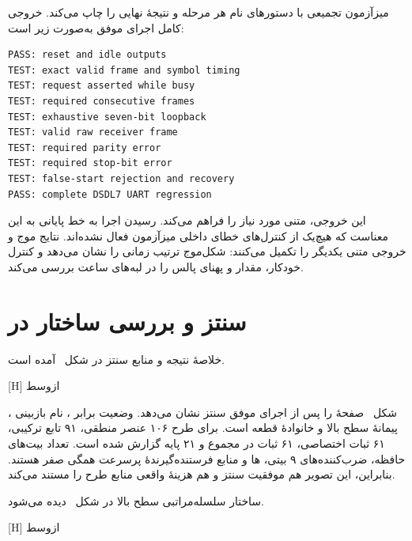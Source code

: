میزآزمون تجمیعی با دستورهای  نام هر مرحله و نتیجهٔ نهایی را چاپ می‌کند.
خروجی کامل اجرای موفق به‌صورت زیر است:

\begin{dsdlcodeblock}
\begin{verbatim}
PASS: reset and idle outputs
TEST: exact valid frame and symbol timing
TEST: request asserted while busy
TEST: required consecutive frames
TEST: exhaustive seven-bit loopback
TEST: valid raw receiver frame
TEST: required parity error
TEST: required stop-bit error
TEST: false-start rejection and recovery
PASS: complete DSDL7 UART regression
\end{verbatim}
\end{dsdlcodeblock}

این خروجی،  متنی مورد نیاز را فراهم می‌کند. رسیدن اجرا به خط پایانی
 به این معناست که هیچ‌یک از کنترل‌های خطای داخلی میزآزمون فعال نشده‌اند. نتایج
موج و خروجی متنی یکدیگر را تکمیل می‌کنند: شکل‌موج ترتیب زمانی را نشان می‌دهد و کنترل
خودکار، مقدار و پهنای پالس را در لبه‌های ساعت بررسی می‌کند.


\section{سنتز و بررسی ساختار در }

خلاصهٔ نتیجه و منابع سنتز در
شکل~ آمده است.

[H]
‌ازوسط

شکل~ صفحهٔ  را پس از
اجرای موفق سنتز نشان می‌دهد. وضعیت  برابر
، نام بازبینی ، پیمانهٔ سطح بالا  و خانوادهٔ قطعه
 است. برای طرح ۱۰۶ عنصر منطقی، ۹۱ تابع
ترکیبی، ۶۱ ثبات
اختصاصی، ۶۱ ثبات در مجموع و ۲۱
پایه گزارش شده است. تعداد بیت‌های حافظه، ضرب‌کننده‌های ۹ بیتی،
ها و منابع فرستنده‌گیرندهٔ پرسرعت همگی صفر هستند. بنابراین، این
تصویر هم موفقیت سنتز و هم هزینهٔ واقعی منابع طرح را مستند می‌کند.

ساختار سلسله‌مراتبی سطح بالا در
شکل~ دیده می‌شود.

[H]
‌ازوسط

